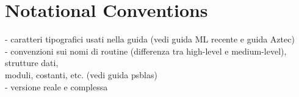 \section{Notational Conventions\label{sec:conventions}}
    - caratteri tipografici usati nella guida (vedi guida ML recente e guida Aztec) \\
    - convenzioni sui nomi di routine (differenza tra high-level e medium-level),
      strutture dati,\\
      moduli, costanti, etc. (vedi guida psblas) \\
    - versione reale e complessa\\